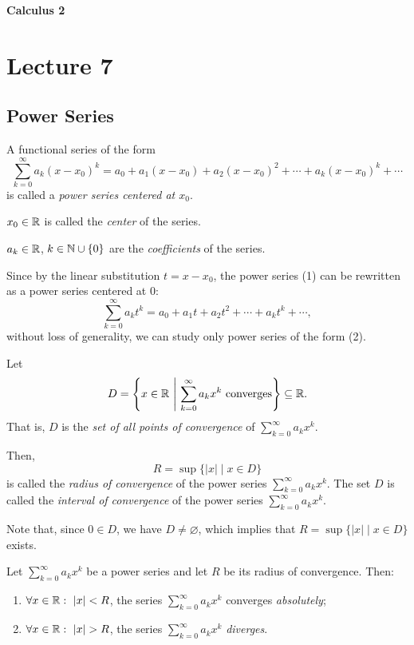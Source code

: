 
{\large\bfseries Calculus 2}

\section{Lecture 7}
\subsection*{Power Series}

\begin{definition}\label{def:7.1}
A functional series of the form
\[
\sum_{k=0}^{\infty}a_k(x-x_0)^k
=a_0+a_1(x-x_0)+a_2(x-x_0)^2+\cdots+a_k(x-x_0)^k+\cdots
\tag{1}\label{eq:7:1:1}
\]
is called a \emph{power series centered at $x_0$}.

$x_0\in\mathbb{R}$ is called the \emph{center} of the series.

$a_k\in\mathbb{R}$, $k\in\mathbb{N}\cup\{0\}$ are the \emph{coefficients} of the series.

Since by the linear substitution $t=x-x_0$, the power series (1) can be rewritten as a power series centered at $0$:
\[
\sum_{k=0}^{\infty}a_kt^k
=a_0+a_1t+a_2t^2+\cdots+a_kt^k+\cdots,
\tag{2}\label{eq:7:2:1}
\]
without loss of generality, we can study only power series of the form (2).
\end{definition}

\begin{definition}\label{def:7.2}
Let
\[
D=\left\{x\in\R\ \middle|\ \sum_{k=0}^{\infty}a_kx^k\text{ converges}\right\}\subseteq\R.
\]
That is, $D$ is the \emph{set of all points of convergence} of $\sum_{k=0}^{\infty}a_kx^k$.

Then,
\[
R=\sup\{|x|\mid x\in D\}
\]
is called the \emph{radius of convergence} of the power series $\sum_{k=0}^{\infty}a_kx^k$.
The set $D$ is called the \emph{interval of convergence} of the power series $\sum_{k=0}^{\infty}a_kx^k$.

Note that, since $0\in D$, we have $D\neq\varnothing$, which implies that
$R=\sup\{|x|\mid x\in D\}$ exists.
\end{definition}

\begin{claim}\label{claim:7.1}
Let $\sum_{k=0}^{\infty}a_kx^k$ be a power series and let $R$ be its radius of convergence.
Then:
\begin{enumerate}
    \item\label{item:claim:7.1:1} $\forall x\in\mathbb{R}:\ |x|<R$, the series $\sum_{k=0}^{\infty}a_kx^k$ converges \emph{absolutely};
    \item\label{item:claim:7.1:2} $\forall x\in\R:\ |x|>R$, the series $\sum_{k=0}^{\infty}a_kx^k$ \emph{diverges}.
\end{enumerate}
\end{claim}

